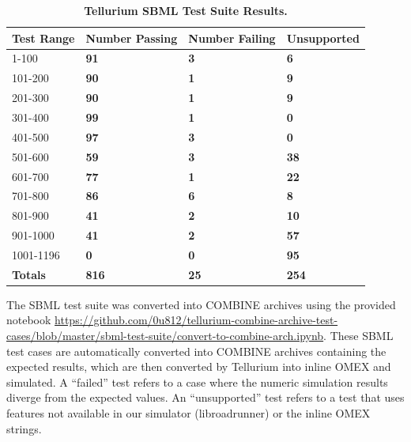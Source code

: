 \documentclass[10pt,letterpaper]{article}
\newlength\savedwidth
\newcommand\thickhline{\noalign{\global\savedwidth\arrayrulewidth\global\arrayrulewidth 2pt}%
\hline
\noalign{\global\arrayrulewidth\savedwidth}}
\begin{document}
\begin{table}[t]
\centering
\caption{
{\bf Tellurium SBML Test Suite Results.} }
\begin{tabular}{l|l|l|l|}
\hline
{\bf Test Range} & {\bf Number Passing} & {\bf Number Failing} & {\bf Unsupported}\\ \hline %
  1-100  & \textbf{91} & \textbf{3} & \textbf{ 6} \\ \hline
101-200  & \textbf{90} & \textbf{1} & \textbf{ 9} \\ \hline
201-300  & \textbf{90} & \textbf{1} & \textbf{ 9} \\ \hline
301-400  & \textbf{99} & \textbf{1} & \textbf{ 0} \\ \hline
401-500  & \textbf{97} & \textbf{3} & \textbf{ 0} \\ \hline
501-600  & \textbf{59} & \textbf{3} & \textbf{38} \\ \hline
601-700  & \textbf{77} & \textbf{1} & \textbf{22} \\ \hline
701-800  & \textbf{86} & \textbf{6} & \textbf{ 8} \\ \hline
801-900  & \textbf{41} & \textbf{2} & \textbf{10} \\ \hline
901-1000 & \textbf{41} & \textbf{2} & \textbf{57} \\ \hline
1001-1196& \textbf{ 0} & \textbf{0} & \textbf{95} \\ \hline
\textbf{Totals}& \textbf{816} & \textbf{25} & \textbf{254} \\ \hline
\end{tabular}
\begin{flushleft} The SBML test suite was converted into COMBINE archives using the provided notebook \href{https://github.com/0u812/tellurium-combine-archive-test-cases/blob/master/sbml-test-suite/convert-to-combine-arch.ipynb}{https://github.com/0u812/tellurium-combine-archive-test-cases/blob/master/sbml-test-suite/convert-to-combine-arch.ipynb}. These SBML test cases are automatically converted into COMBINE archives containing the expected results, which are then converted by Tellurium into inline OMEX and simulated. A ``failed'' test refers to a case where the numeric simulation results diverge from the expected values. An ``unsupported'' test refers to a test that uses features not available in our simulator (libroadrunner) or the inline OMEX strings.
\end{flushleft}
\label{sbmlbenchmark}
\end{table}
\end{document}
